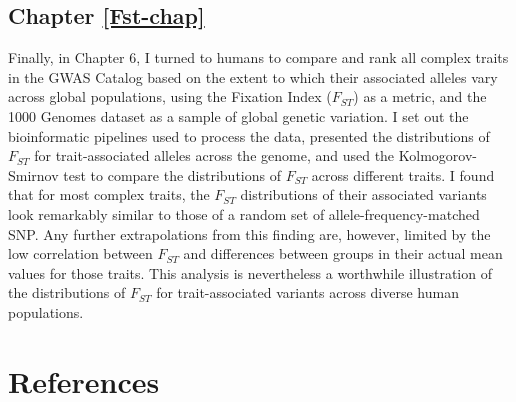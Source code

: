 \documentclass[
]{book}
\begin{document}
\hypertarget{chapter-reffst-chap}{%
\section*{Chapter \ref{Fst-chap}}\label{chapter-reffst-chap}}

Finally, in Chapter 6, I turned to humans to compare and rank all complex traits in the GWAS Catalog based on the extent to which their associated alleles vary across global populations, using the Fixation Index (\(F_{ST}\)) as a metric, and the 1000 Genomes dataset as a sample of global genetic variation. I set out the bioinformatic pipelines used to process the data, presented the distributions of \(F_{ST}\) for trait-associated alleles across the genome, and used the Kolmogorov-Smirnov test to compare the distributions of \(F_{ST}\) across different traits. I found that for most complex traits, the \(F_{ST}\) distributions of their associated variants look remarkably similar to those of a random set of allele-frequency-matched SNP. Any further extrapolations from this finding are, however, limited by the low correlation between \(F_{ST}\) and differences between groups in their actual mean values for those traits. This analysis is nevertheless a worthwhile illustration of the distributions of \(F_{ST}\) for trait-associated variants across diverse human populations.

\hypertarget{references}{%
\chapter*{References}\label{references}}
\end{document}
